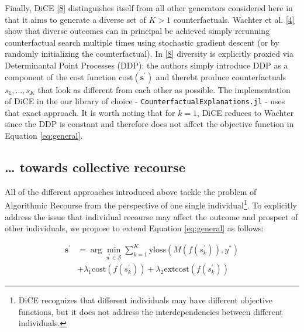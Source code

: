 \documentclass[conference,final,]{IEEEtran}
\theoremstyle{definition}
\theoremstyle{definition}
\theoremstyle{definition}
\theoremstyle{definition}
\theoremstyle{remark}
\begin{document}
Finally, DiCE \protect\hyperlink{ref-mothilal2020explaining}{{[}8{]}} distinguishes itself from all other generators considered here in that it aims to generate a diverse set of \(K>1\) counterfactuals. Wachter et al. \protect\hyperlink{ref-wachter2017counterfactual}{{[}4{]}} show that diverse outcomes can in principal be achieved simply rerunning counterfactual search multiple times using stochastic gradient descent (or by randomly initializing the counterfactual). In \protect\hyperlink{ref-mothilal2020explaining}{{[}8{]}} diversity is explicitly proxied via Determinantal Point Processes (DDP): the authors simply introduce DDP as a component of the cost function \(\text{cost}(\mathbf{s}^\prime)\) and therebt produce counterfactuals \(s_1, ... , s_K\) that look as different from each other as possible. The implementation of DiCE in the our library of choice - \texttt{CounterfactualExplanations.jl} - uses that exact approach. It is worth noting that for \(k=1\), DiCE reduces to Wachter since the DDP is constant and therefore does not affect the objective function in Equation \eqref{eq:general}.

\hypertarget{towards-collective-recourse}{%
\subsection{\ldots{} towards collective recourse}\label{towards-collective-recourse}}

All of the different approaches introduced above tackle the problem of Algorithmic Recourse from the perspective of one single individual\footnote{DiCE recognizes that different individuals may have different objective functions, but it does not address the interdependencies between different individuals.}. To explicitly address the issue that individual recourse may affect the outcome and prospect of other individuals, we propose to extend Equation \eqref{eq:general} as follows:

\begin{equation}
\begin{aligned}
\mathbf{s}^\prime &= \arg \min_{\mathbf{s}^\prime \in \mathcal{S}}  \sum_{k=1}^{K} {\text{yloss}(M(f(s_k^\prime)),y^*)} \\ &+ \lambda_1 {\text{cost}(f(s_k^\prime))} + \lambda_2 {\text{extcost}(f(s_k^\prime))}  \label{eq:collective}
\end{aligned} 
\end{equation}
\end{document}

